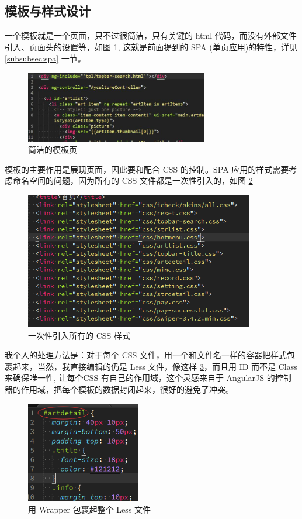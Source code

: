\documentclass[UTF8]{ctexbook}
\begin{document}
    \subsection{模板与样式设计}
      \label{subsec:模板与样式设计}
        一个模板就是一个页面，只不过很简洁，只有关键的 html 代码，而没有外部文件引入、页面头的设置等，如图 \ref{fig:tpl1}, 这就是前面提到的 SPA (单页应用)的特性，详见 \ref{subsubsec:spa} 一节。
        \begin{figure}[H]
          \centering
          \includegraphics[width=8cm]{./img/tpl.jpg}
          \caption{简洁的模板页}
          \label{fig:tpl1}
        \end{figure}
        模板的主要作用是展现页面，因此要和配合 CSS 的控制。SPA 应用的样式需要考虑命名空间的问题，因为所有的 CSS 文件都是一次性引入的，如图 \ref{fig:css}
        \begin{figure}[H]
          \centering
          \includegraphics[width=10cm]{./img/css.png}
          \caption{一次性引入所有的 CSS 样式}
          \label{fig:css}
        \end{figure}
        我个人的处理方法是：对于每个 CSS 文件，用一个和文件名一样的容器把样式包裹起来，当然，我直接编辑的仍是 Less 文件，像这样 \ref{fig:wrapper}，而且用 ID 而不是 Class 来确保唯一性, 让每个CSS 有自己的作用域，这个灵感来自于 AngularJS 的控制器的作用域，把每个模板的数据封闭起来，很好的避免了冲突。
        \begin{figure}[H]
          \centering
          \includegraphics[width=5cm]{./img/wrapper.png}
          \caption{用 Wrapper 包裹起整个 Less 文件}
          \label{fig:wrapper}
        \end{figure}
\end{document}
